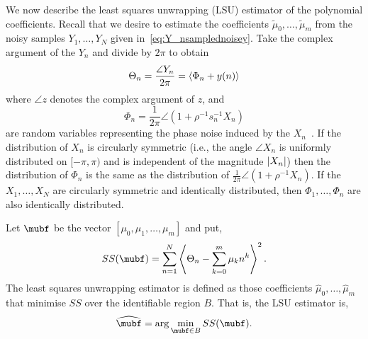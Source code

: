 \documentclass[journal]{IEEEtran}
\begin{document}
We now describe the least squares unwrapping (LSU) estimator of the polynomial coefficients. Recall that we desire to estimate the coefficients $\tilde{\mu}_0, \dots, \tilde{\mu}_m$ from the noisy samples $Y_1, \dots, Y_N$ given in~\eqref{eq:Y_nsamplednoisey}.  Take the complex argument of the $Y_n$ and divide by $2\pi$ to obtain
\begin{equation}\label{eq:noise_circ_poly}
\Theta_n = \frac{\angle{Y_n}}{2\pi} = \left\langle  \Phi_n + y(n)  \right\rangle
\end{equation}
where $\angle{z}$ denotes the complex argument of $z$, and 
\[
\Phi_n = \frac{1}{2\pi}\angle(1 + \rho^{-1}s_n^{-1}X_n)
\] 
are random variables representing the phase noise induced by the $X_n$~\cite{Tretter1985,Quinn2009_dasp_phase_only_information_loss}.  If the distribution of $X_n$ is circularly symmetric (i.e., the angle $\angle X_n$ is uniformly distributed on $[-\pi, \pi)$ and is independent of the magnitude $\left\vert X_n \right\vert$) then the distribution of $\Phi_n$ is the same as the distribution of $\tfrac{1}{2\pi}\angle(1 + \rho^{-1}X_n)$.  If the $X_1, \dots, X_N$ are circularly symmetric and identically distributed, then $\Phi_1, \dots, \Phi_n$ are also identically distributed.

Let $\mubf$ be the vector $[\mu_0, \mu_1, \dots, \mu_m]$ and put,
\begin{equation} \label{eq:sumofsquaresfunction}
SS(\mubf) = \sum_{n=1}^{N}\fracpart{  \Theta_{n} - \sum_{k = 0}^{m}{\mu_k n^k} }^{2}.
\end{equation}
The least squares unwrapping estimator is defined as those coefficients $\widehat{\mu}_0, \dots, \widehat{\mu}_m$ that minimise $SS$ over the identifiable region $B$. That is, the LSU estimator is,
\begin{equation}\label{eq:hatmubfLSUdefn}
\widehat{\mubf} = \arg \min_{\mubf \in B} SS(\mubf). 
\end{equation}
\end{document}
